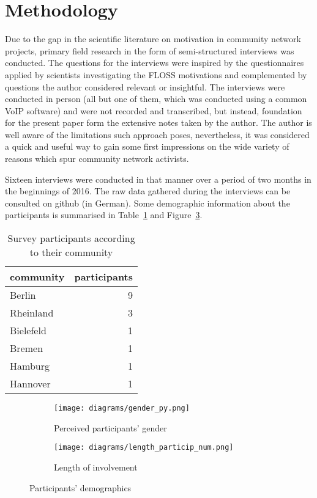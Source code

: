 \section{Methodology}

Due to the gap in the scientific literature on motivation in community network projects, primary field research in the form of semi-structured interviews was conducted.
The questions for the interviews were inspired by the questionnaires applied by scientists investigating the FLOSS motivations\cite{HarOu2002}\cite{LakWo2005} and complemented by questions the author considered relevant or insightful.
The interviews were conducted in person (all but one of them, which was conducted using a common VoIP software) and were not recorded and transcribed, but instead, foundation for the present paper form the extensive notes taken by the author.
The author is well aware of the limitations such approach poses, nevertheless, it was considered a quick and useful way to gain some first impressions on the wide variety of reasons which spur community network activists.

Sixteen interviews were conducted in that manner over a period of two months in the beginnings of 2016.
The raw data gathered during the interviews can be consulted on github\cite{FFInterviews} (in German).
Some demographic information about the participants is summarised in Table~\ref{tab:communities} and Figure~\ref{fig:demography}.

\begin{table}[h]
  \begin{tabular}{| l | r |}
    \hline
    \textbf{community} & \textbf{participants}\\
    \hline
    Berlin & 9 \\
    \hline
    Rheinland & 3 \\
    \hline
    Bielefeld & 1 \\
    \hline
    Bremen & 1 \\
    \hline
    Hamburg & 1 \\
    \hline
    Hannover & 1 \\
    \hline
  \end{tabular}
\caption{Survey participants according to their community}
\label{tab:communities}
\end{table}


\begin{figure}[h]
  \begin{subfigure}[h]{0.5\textwidth}
    \centering
    \texttt{[image: diagrams/gender\_py.png]}
    \caption{Perceived participants' gender}
    \label{fig:gender}
  \end{subfigure}
  \qquad
  \begin{subfigure}[h]{0.5\textwidth}
    \centering
    \texttt{[image: diagrams/length\_particip\_num.png]}
    \caption{Length of involvement}
    \label{fig:length}
  \end{subfigure}
  \caption{Participants' demographics}
  \label{fig:demography}
\end{figure}

